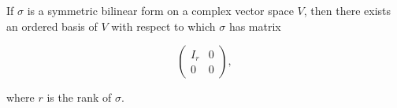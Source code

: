 If $\sigma$ is a symmetric bilinear form on a complex vector space $V$, then there exists an ordered basis of $V$ with respect to which $\sigma$ has matrix

$$\begin{pmatrix} I_r & 0 \\ 0 & 0 \end{pmatrix},$$

where $r$ is the rank of $\sigma$.
